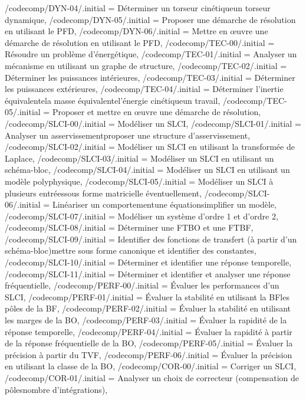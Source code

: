 {    /codecomp/DYN-04/.initial = Déterminer un torseur cinétique\CommaXp un torseur dynamique,
    /codecomp/DYN-05/.initial = Proposer une démarche de résolution en utilisant le PFD,
    /codecomp/DYN-06/.initial = Mettre en œuvre une démarche de résolution en utilisant le PFD,
    /codecomp/TEC-00/.initial = Résoudre un problème d'énergétique,
    /codecomp/TEC-01/.initial = Analyser un mécanisme en utilisant un graphe de structure,
    /codecomp/TEC-02/.initial = Déterminer les puissances intérieures,
    /codecomp/TEC-03/.initial = Déterminer les puissances extérieures,
    /codecomp/TEC-04/.initial = Déterminer l'inertie équivalente\CommaXp la masse équivalente\CommaXp l'énergie cinétique\CommaXp un travail,
    /codecomp/TEC-05/.initial = Proposer et mettre en œuvre une démarche de résolution,
    /codecomp/SLCI-00/.initial = Modéliser un SLCI,
    /codecomp/SLCI-01/.initial = Analyser un asservissement\CommaXp proposer une structure d'asservissement,
    /codecomp/SLCI-02/.initial = Modéliser un SLCI en utilisant la transformée de Laplace,
    /codecomp/SLCI-03/.initial = Modéliser un SLCI en utilisant un schéma-bloc,
    /codecomp/SLCI-04/.initial = Modéliser un SLCI en utilisant un modèle polyphysique,
	/codecomp/SLCI-05/.initial = Modéliser un SLCI à plusieurs entrées\CommaXp sous forme matricielle éventuellement,
    /codecomp/SLCI-06/.initial = Linéariser un comportement\CommaXp une équation\CommaXp simplifier un modèle,
    /codecomp/SLCI-07/.initial = Modéliser un système d'ordre 1 et d'ordre 2,
    /codecomp/SLCI-08/.initial = Déterminer une FTBO et une FTBF,
    /codecomp/SLCI-09/.initial = Identifier des fonctions de transfert (à partir d'un schéma-bloc)\CommaXp mettre sous forme canonique et identifier des constantes,
    /codecomp/SLCI-10/.initial = Déterminer et identifier une réponse temporelle,
    /codecomp/SLCI-11/.initial = Déterminer et identifier et analyser une réponse fréquentielle,
    /codecomp/PERF-00/.initial = Évaluer les performances d'un SLCI,
    /codecomp/PERF-01/.initial = Évaluer la stabilité en utilisant la BF\CommaXp les pôles de la BF,
    /codecomp/PERF-02/.initial = Évaluer la stabilité en utilisant les marges de la BO,
    /codecomp/PERF-03/.initial = Évaluer la rapidité de la réponse temporelle,
    /codecomp/PERF-04/.initial = Évaluer la rapidité à partir de la réponse fréquentielle de la BO,
    /codecomp/PERF-05/.initial = Évaluer la précision à partir du TVF,
    /codecomp/PERF-06/.initial = Évaluer la précision en utilisant la classe de la BO,
    /codecomp/COR-00/.initial = Corriger un SLCI,
    /codecomp/COR-01/.initial = Analyser un choix de correcteur (compensation de pôles\CommaXp nombre d'intégrations),
}
